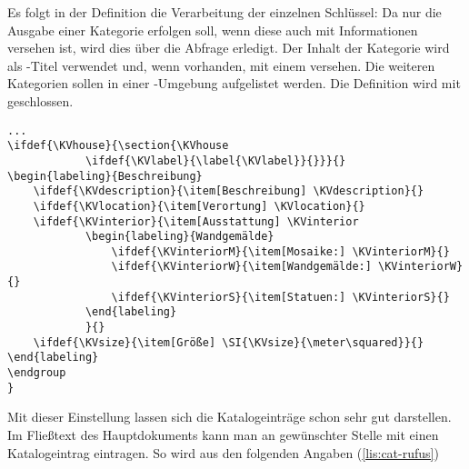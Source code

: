 \documentclass[ngerman]{dtk}
\begin{document}
Es folgt in der Definition die Verarbeitung der einzelnen Schlüssel:
Da nur die Ausgabe einer Kategorie erfolgen soll,
wenn diese auch mit Informationen versehen ist,
wird dies über die Abfrage  erledigt.
Der Inhalt der Kategorie  wird als -Titel verwendet und, wenn vorhanden, mit einem  versehen.
Die weiteren Kategorien sollen in einer -Umgebung aufgelistet werden.
Die Definition wird mit  geschlossen.
\begin{lstlisting}[style=number,caption={Definition der Katalogeinträge, Fortsetzung},label={lis:cat-2}]
...
\ifdef{\KVhouse}{\section{\KVhouse
			\ifdef{\KVlabel}{\label{\KVlabel}}{}}}{}
\begin{labeling}{Beschreibung}
	\ifdef{\KVdescription}{\item[Beschreibung] \KVdescription}{}
	\ifdef{\KVlocation}{\item[Verortung] \KVlocation}{}
	\ifdef{\KVinterior}{\item[Ausstattung] \KVinterior
			\begin{labeling}{Wandgemälde}
				\ifdef{\KVinteriorM}{\item[Mosaike:] \KVinteriorM}{}
				\ifdef{\KVinteriorW}{\item[Wandgemälde:] \KVinteriorW}{}
				\ifdef{\KVinteriorS}{\item[Statuen:] \KVinteriorS}{}
			\end{labeling}
			}{}
	\ifdef{\KVsize}{\item[Größe] \SI{\KVsize}{\meter\squared}}{}
\end{labeling}
\endgroup
}
\end{lstlisting}

Mit dieser Einstellung lassen sich die Katalogeinträge schon sehr gut darstellen.
Im Fließtext des Hauptdokuments kann man an gewünschter Stelle mit  einen Katalogeintrag eintragen.
So wird aus den folgenden Angaben (\cref{lis:cat-rufus})
\end{document}
